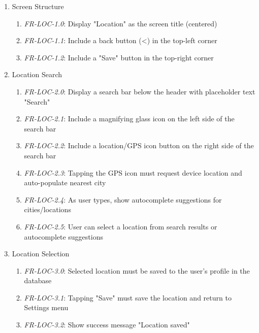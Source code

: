 \documentclass[conference]{IEEEtran}
\begin{document}
                \begin{enumerate}
                    \item Screen Structure
                        \begin{enumerate}
                            \item \textit{FR-LOC-1.0}: Display "Location" as the screen title (centered)
                            \item \textit{FR-LOC-1.1}: Include a back button (<) in the top-left corner
                            \item \textit{FR-LOC-1.2}: Include a "Save" button in the top-right corner
                        \end{enumerate}
                    \item Location Search
                        \begin{enumerate}
                            \item \textit{FR-LOC-2.0}: Display a search bar below the header with placeholder text "Search"
                            \item \textit{FR-LOC-2.1}: Include a magnifying glass icon on the left side of the search bar
                            \item \textit{FR-LOC-2.2}: Include a location/GPS icon button on the right side of the search bar
                            \item \textit{FR-LOC-2.3}: Tapping the GPS icon must request device location and auto-populate nearest city
                            \item \textit{FR-LOC-2.4}: As user types, show autocomplete suggestions for cities/locations
                            \item \textit{FR-LOC-2.5}: User can select a location from search results or autocomplete suggestions
                        \end{enumerate}
                    \item Location Selection
                        \begin{enumerate}
                            \item \textit{FR-LOC-3.0}: Selected location must be saved to the user's profile in the database
                            \item \textit{FR-LOC-3.1}: Tapping "Save" must save the location and return to Settings menu
                            \item \textit{FR-LOC-3.2}: Show success message "Location saved"

\end{enumerate}
\end{enumerate}
\end{document}
